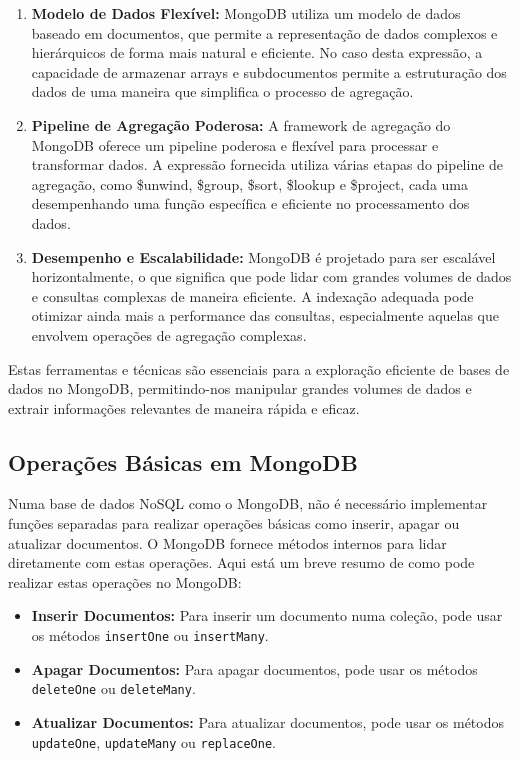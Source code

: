\begin{enumerate}
    \item \textbf{Modelo de Dados Flexível:} MongoDB utiliza um modelo de dados baseado em documentos, que permite a representação de dados complexos e hierárquicos de forma mais natural e eficiente. No caso desta expressão, a capacidade de armazenar arrays e subdocumentos permite a estruturação dos dados de uma maneira que simplifica o processo de agregação.
    \item \textbf{Pipeline de Agregação Poderosa:} A framework de agregação do MongoDB oferece um pipeline poderosa e flexível para processar e transformar dados. A expressão fornecida utiliza várias etapas do pipeline de agregação, como \$unwind, \$group, \$sort, \$lookup e \$project, cada uma desempenhando uma função específica e eficiente no processamento dos dados.
    \item \textbf{Desempenho e Escalabilidade:} MongoDB é projetado para ser escalável horizontalmente, o que significa que pode lidar com grandes volumes de dados e consultas complexas de maneira eficiente. A indexação adequada pode otimizar ainda mais a performance das consultas, especialmente aquelas que envolvem operações de agregação complexas.
\end{enumerate}

Estas ferramentas e técnicas são essenciais para a exploração eficiente de bases de dados no MongoDB, permitindo-nos manipular grandes volumes de dados e extrair informações relevantes de maneira rápida e eficaz.

\subsection{Operações Básicas em MongoDB}

Numa base de dados NoSQL como o MongoDB, não é necessário implementar funções separadas para realizar operações básicas como inserir, apagar ou atualizar documentos. O MongoDB fornece métodos internos para lidar diretamente com estas operações. Aqui está um breve resumo de como pode realizar estas operações no MongoDB:

\begin{itemize}
    \item \textbf{Inserir Documentos:} Para inserir um documento numa coleção, pode usar os métodos \texttt{insertOne} ou \texttt{insertMany}.
    \item \textbf{Apagar Documentos:} Para apagar documentos, pode usar os métodos \texttt{deleteOne} ou \texttt{deleteMany}.
    \item \textbf{Atualizar Documentos:} Para atualizar documentos, pode usar os métodos \texttt{updateOne}, \texttt{updateMany} ou \texttt{replaceOne}.
\end{itemize}

